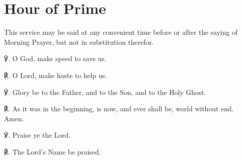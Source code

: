 \fancyhead[RE,LO]{}
\section{Hour of Prime}
\begin{secrubric}
	This service may be said at any convenient time before or after the saying of Morning Prayer, but not in substitution therefor.
\end{secrubric}

\begin{multicols}{2}

℣. O God, {} make speed to save us.

℟. O Lord, make haste to help us.

℣. Glory be to the Father, and to the Son, and to the Holy Ghost.

℟. As it was in the beginning, is now, and ever shall be, world without end. Amen.

℣. Praise ye the Lord.

℟. The Lord's Name be praised.


\end{multicols}
